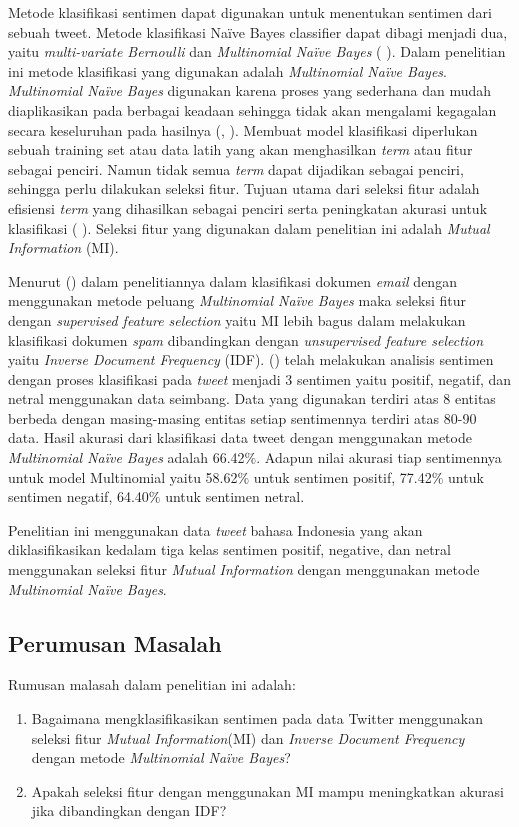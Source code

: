 Metode klasifikasi sentimen dapat digunakan untuk menentukan sentimen dari sebuah tweet. Metode klasifikasi Naïve Bayes classifier dapat dibagi menjadi dua, yaitu \textit{multi-variate Bernoulli} dan \textit{Multinomial Naïve Bayes} (\citeauthor{MANNING2008} \cite*{MANNING2008}). Dalam penelitian ini metode klasifikasi yang digunakan adalah \textit{Multinomial  Naïve Bayes}. \textit{Multinomial Naïve Bayes} digunakan karena proses yang sederhana dan mudah diaplikasikan pada berbagai keadaan sehingga tidak akan mengalami kegagalan secara keseluruhan pada hasilnya (\citeauthor{MANNING2008}, \cite*{MANNING2008}). Membuat model klasifikasi diperlukan sebuah training set atau data latih yang akan menghasilkan \textit{term} atau fitur sebagai penciri. Namun tidak semua \textit{term} dapat dijadikan sebagai penciri, sehingga perlu dilakukan seleksi fitur. Tujuan utama dari seleksi fitur adalah efisiensi \textit{term} yang dihasilkan sebagai penciri serta peningkatan akurasi untuk klasifikasi (\citeauthor{MANNING2008} \cite*{MANNING2008}). Seleksi fitur yang digunakan dalam penelitian ini adalah \textit{Mutual Information }(MI). 

Menurut \citeauthor{DIMASTYO2014} (\cite*{DIMASTYO2014}) dalam penelitiannya dalam klasifikasi dokumen \textit{email} dengan menggunakan metode peluang\textit{ Multinomial Naïve Bayes} maka seleksi fitur dengan \textit{supervised feature selection} yaitu MI lebih bagus dalam melakukan klasifikasi dokumen \textit{spam} dibandingkan dengan \textit{unsupervised feature selection} yaitu \textit{Inverse Document Frequency} (IDF). \citeauthor{ADITYAWAN2014} (\cite*{ADITYAWAN2014}) telah melakukan analisis sentimen dengan proses klasifikasi pada \textit{tweet} menjadi 3 sentimen yaitu positif, negatif, dan netral menggunakan data seimbang. Data yang digunakan terdiri atas 8 entitas berbeda dengan masing-masing entitas setiap sentimennya terdiri atas 80-90 data. Hasil akurasi dari klasifikasi data tweet dengan menggunakan metode \textit{Multinomial  Naïve Bayes} adalah 66.42$\%$. Adapun nilai akurasi tiap sentimennya untuk model Multinomial yaitu 58.62$\%$ untuk sentimen positif, 77.42$\%$ untuk sentimen negatif, 64.40$\%$ untuk sentimen netral.

Penelitian ini menggunakan data \textit{tweet} bahasa Indonesia yang akan diklasifikasikan kedalam tiga kelas sentimen positif, negative, dan netral menggunakan seleksi fitur \textit{Mutual Information} dengan menggunakan metode \textit{Multinomial Naïve Bayes}.

\subsection*{Perumusan Masalah}
Rumusan malasah dalam penelitian ini adalah:
\begin{enumerate}[noitemsep] 
	\item Bagaimana mengklasifikasikan sentimen  pada data Twitter menggunakan seleksi fitur \textit{Mutual Information}(MI) dan \textit{Inverse Document Frequency} dengan metode \textit{Multinomial Naïve Bayes}?
	\item Apakah seleksi fitur dengan menggunakan MI mampu meningkatkan akurasi jika dibandingkan dengan IDF?
\end{enumerate}

